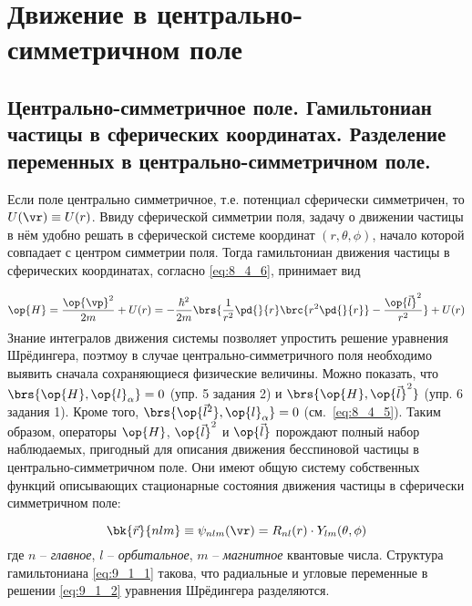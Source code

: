 \chapter{Движение в центрально-симметричном поле}

\begin{sloppypar}
\section{Центрально-симметричное поле. Гамильтониан частицы в сферических координатах. Разделение переменных в центрально-симметричном поле.}
\end{sloppypar}

Если поле центрально симметричное, т.е. потенциал сферически симметричен, то $U(\vr) \equiv U(r)$. Ввиду сферической симметрии поля, задачу о движении частицы в нём удобно решать в сферической системе координат $(r, \theta, \phi)$, начало которой совпадает с центром симметрии поля. Тогда гамильтониан движения частицы в сферических координатах, согласно \eqref{eq:8_4_6}, принимает вид

\begin{equation}
\label{eq:9_1_1}
\op{H} = \frac{\op{\vp}^2}{2m} + U(r) = - \frac{\hbar^2}{2m} \brs{\frac{1}{r^2} \pd{}{r} \brc{r^2 \pd{}{r}} - \frac{\op{\vec{l}}^2}{r^2}} + U(r)
\end{equation}%
%
Знание интегралов движения системы позволяет упростить решение уравнения Шрёдингера, поэтмоу в случае центрально-симметричного поля необходимо выявить сначала сохраняющиеся физические величины. Можно показать, что $\brs{\op{H}, \op{l}_\alpha} = 0$ (упр. 5 задания 2) и $\brs{\op{H}, \op{\vec{l}}^2}$ (упр. 6 задания 1). Кроме того, $\brs{\op{\vec{l}^2}, \op{l}_\alpha} = 0$ (см.~\eqref{eq:8_4_5}). Таким образом, операторы $\op{H}$, $\op{\vec{l}}^2$ и $\op{\vec{l}}$ порождают полный набор наблюдаемых, пригодный для описания движения бесспиновой частицы в центрально-симметричном поле. Они имеют общую систему собственных функций описывающих стационарные состояния движения частицы в сферически симметричном поле:

\begin{equation}
\label{eq:9_1_2}
\bk{\vec{r}}{nlm} \equiv \psi_{nlm}(\vr) = R_{nl}(r) \cdot Y_{lm}(\theta, \phi)
\end{equation}%
%
где $n$ -- {\em главное}, $l$ -- {\em орбитальное}, $m$ -- {\em магнитное} квантовые числа. Структура гамильтониана \eqref{eq:9_1_1} такова, что радиальные и угловые переменные в решении \eqref{eq:9_1_2} уравнения Шрёдингера разделяются.

